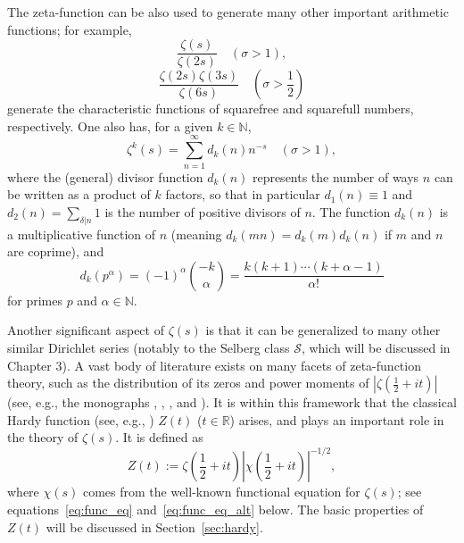 \documentclass[11pt]{article}
\begin{document}
The zeta-function can be also used to generate many other important arithmetic functions; for example,
\begin{equation}\label{eq:squarefree}
\frac{\zeta(s)}{\zeta(2s)} \quad (\sigma > 1),
\end{equation}
\begin{equation}\label{eq:squarefull}
\frac{\zeta(2s)\zeta(3s)}{\zeta(6s)} \quad (\sigma > \frac{1}{2})
\end{equation}
generate the characteristic functions of squarefree and squarefull numbers, respectively. One also has, for a given $k \in \mathbb{N}$,
\begin{equation}\label{eq:divisor_gen}
\zeta^k(s) = \sum_{n=1}^{\infty} d_k(n) n^{-s} \quad (\sigma > 1),
\end{equation}
where the (general) divisor function $d_k(n)$ represents the number of ways $n$ can be written as a product of $k$ factors, so that in particular $d_1(n) \equiv 1$ and $d_2(n) = \sum_{\delta|n} 1$ is the number of positive divisors of $n$. The function $d_k(n)$ is a multiplicative function of $n$ (meaning $d_k(mn) = d_k(m)d_k(n)$ if $m$ and $n$ are coprime), and
\begin{equation}\label{eq:divisor_prime}
d_k(p^{\alpha}) = (-1)^{\alpha} \binom{-k}{\alpha} = \frac{k(k+1) \cdots (k+\alpha-1)}{\alpha!}
\end{equation}
for primes $p$ and $\alpha \in \mathbb{N}$.

Another significant aspect of $\zeta(s)$ is that it can be generalized to many other similar Dirichlet series (notably to the Selberg class $\mathcal{S}$, which will be discussed in Chapter 3). A vast body of literature exists on many facets of zeta-function theory, such as the distribution of its zeros and power moments of $|\zeta(\frac{1}{2} + it)|$ (see, e.g., the monographs \cite{Iv1}, \cite{Iv4}, \cite{Mot1}, \cite{Ram} and \cite{Tit3}). It is within this framework that the classical Hardy function (see, e.g., \cite{Iv1}) $Z(t)$ ($t \in \mathbb{R}$) arises, and plays an important role in the theory of $\zeta(s)$. It is defined as
\begin{equation}\label{eq:hardy_def}
Z(t) := \zeta\left(\frac{1}{2} + it\right) \left| \chi\left(\frac{1}{2} + it\right) \right|^{-1/2},
\end{equation}
where $\chi(s)$ comes from the well-known functional equation for $\zeta(s)$; see equations~\eqref{eq:func_eq} and~\eqref{eq:func_eq_alt} below. The basic properties of $Z(t)$ will be discussed in Section~\ref{sec:hardy}.
\end{document}
